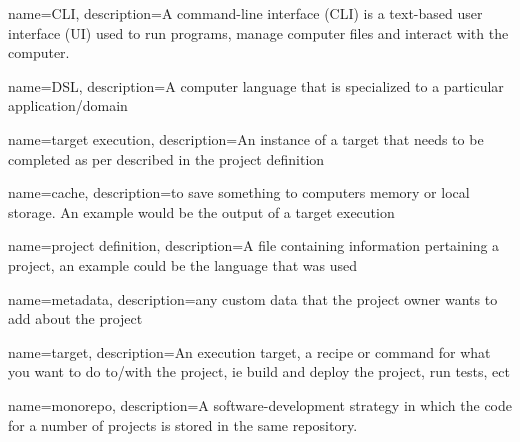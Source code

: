 \usepackage{glossaries}

\makeglossaries{}


{
    name={CLI},
    description={A command-line interface (CLI) is a text-based user interface (UI) used to run programs, manage computer files and interact with the computer.}
}

{
    name=DSL,
    description={A computer language that is specialized to a particular application/domain}
}

{
    name=target execution,
    description={An instance of a \gls{target} that needs to be completed as per described in the project definition}
}

{
    name=cache,
    description={to save something to computers memory or local storage. An example would be the output of a \gls{target execution}}
}

{
    name=project definition,
    description={A file containing information pertaining a project, an example could be the language that was used}
}

{
    name=metadata,
    description={any custom data that the project owner wants to add about the project}
}

{
    name=target,
    description={An execution target, a recipe or command for what you want to do to/with the project, ie build and deploy the project, run tests, ect}
}

{
  name=monorepo,
  description={A software-development strategy in which the code for a number of projects is stored in the same repository.}
}